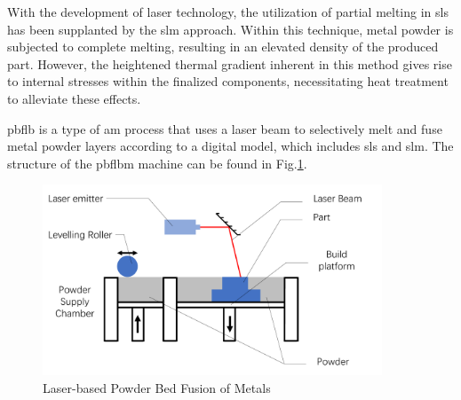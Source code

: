 With the development of laser technology, the utilization of partial 
melting in \gls{sls} has been supplanted by the \gls{slm} approach. 
Within this technique, metal powder is subjected to complete melting, 
resulting in an elevated density of the produced part. However, 
the heightened thermal gradient inherent in this method gives rise to 
internal stresses within the finalized components\cite{Hooper.2018}, necessitating
heat treatment to alleviate these effects\cite{Osakada.2006}.


\gls{pbflb} is a type of \gls{am} process that uses a 
laser beam to selectively melt and fuse metal powder layers according 
to a digital model\cite{Swift.2013}, which includes \gls{sls} and \gls{slm}.
The structure of the \gls{pbflbm} machine can be found in Fig.\ref{fig: pbflbm}.

\begin{figure}[htbp]
    \centering
    \includegraphics[width=0.9\textwidth]{figures/pbflbm.pdf}
    \caption{Laser-based Powder Bed Fusion of Metals}
    \label{fig: pbflbm}
\end{figure}


